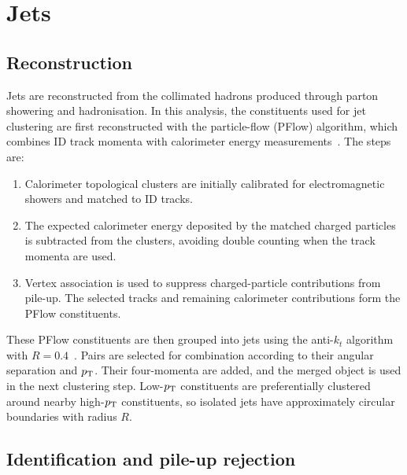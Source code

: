 \section{Jets}
\label{sec:ch6_jets}

\subsection{Reconstruction}

Jets are reconstructed from the collimated hadrons produced through parton showering and hadronisation.
In this analysis, the constituents used for jet clustering are first reconstructed with the particle-flow (PFlow) algorithm, which combines ID track momenta with calorimeter energy measurements~\cite{ATLAS2017ParticleFlow}.
The steps are:
\begin{enumerate}
    \item Calorimeter topological clusters are initially calibrated for electromagnetic showers and matched to ID tracks.
    \item The expected calorimeter energy deposited by the matched charged particles is subtracted from the clusters, avoiding double counting when the track momenta are used.
    \item Vertex association is used to suppress charged-particle contributions from pile-up. The selected tracks and remaining calorimeter contributions form the PFlow constituents.
\end{enumerate}

These PFlow constituents are then grouped into jets using the anti-$k_t$ algorithm with $R=0.4$~\cite{Cacciari2008AntiKt}.
Pairs are selected for combination according to their angular separation and $p_{\mathrm{T}}$.
Their four-momenta are added, and the merged object is used in the next clustering step.
Low-$p_{\mathrm{T}}$ constituents are preferentially clustered around nearby high-$p_{\mathrm{T}}$ constituents, so isolated jets have approximately circular boundaries with radius $R$.

\subsection{Identification and pile-up rejection}

